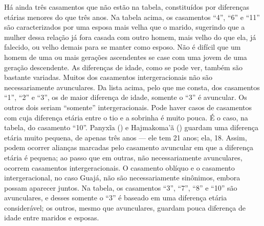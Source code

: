 Há ainda três casamentos que não estão na tabela, constituídos por
diferenças etárias menores do que três anos. Na tabela acima, os
casamentos ``4'', ``6'' e ``11'' são caracterizados por uma esposa mais
velha que o marido, sugerindo que a mulher dessa relação já fora casada
com outro homem, mais velho do que ela, já falecido, ou velho demais
para se manter como esposo. Não é difícil que um homem de uma ou mais
gerações ascendentes se case com uma jovem de uma geração descendente.
As diferenças de idade, como se pode ver, também são bastante variadas.
Muitos dos casamentos intergeracionais não são necessariamente
avunculares. Da lista acima, pelo que me consta, dos casamentos ``1'',
``2'' e ``3'', os de maior diferença de idade, somente o ``3'' é
avuncular. Os outros dois seriam ``somente'' intergeracionais. Pode haver
casos de casamentos com  cuja diferença etária entre o tio e a
sobrinha é muito pouca. É o caso, na tabela, do casamento ``10''. Panyxĩa
() e Hajmakoma'ã () guardam uma diferença etária muito pequena, de
apenas três anos --- ele tem 21 anos; ela, 18. Assim, podem ocorrer
alianças marcadas pelo casamento avuncular em que a diferença etária é
pequena; ao passo que em outras, não necessariamente avunculares,
ocorrem casamentos intergeracionais. O casamento oblíquo e o casamento
intergeracional, no caso Guajá, não são necessariamente sinônimos,
embora possam aparecer juntos. Na tabela, os casamentos ``3'', ``7'', ``8'' e
``10'' são avunculares, e desses somente o ``3'' é baseado em uma diferença
etária considerável; os outros, mesmo que avunculares, guardam pouca
diferença de idade entre maridos e esposas.

